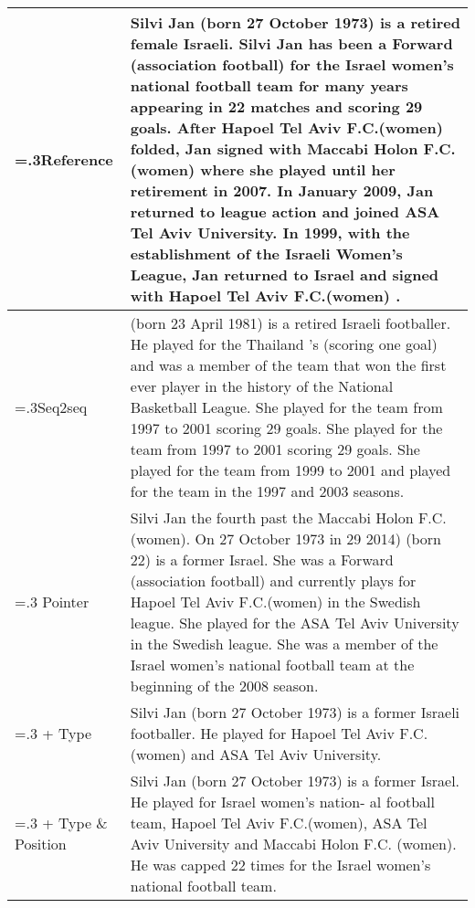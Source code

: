 \documentclass[11pt,a4paper]{article}
\begin{document}
\begin{table*}[!htb]
\small
\setlength\tabcolsep{4pt}
\setlength\extrarowheight{3pt}
\centering
\begin{tabularx}{\linewidth}{|>{\hsize=.3\hsize}X|>{\hsize=1.7\hsize}X|}
\hline
Reference & \colorbox{fl1!40}{Silvi Jan} (born \colorbox{fl2!40}{27 October 1973}) is a retired female \colorbox{fl4!40}{Israeli}. \colorbox{fl1!40}{Silvi Jan} has been a \colorbox{fl8!40}{Forward (association football)} for the \colorbox{fl5!50}{Israel women's national football team} for many years appearing in \colorbox{fl6!30}{22} matches and scoring \colorbox{fl7!40}{29} goals. After \colorbox{fl5!30}{Hapoel Tel Aviv F.C.(women)} folded, Jan signed with \colorbox{fl5!40}{Maccabi Holon F.C. (women)} where she played until her retirement in 2007. In January 2009, Jan returned to league action and joined \colorbox{fl5!20}{ASA Tel Aviv University}. In 1999, with the establishment of the Israeli Women's League, Jan returned to \colorbox{fl4!40}{Israel} and signed with \colorbox{fl5!30}{Hapoel Tel Aviv F.C.(women)} .\\ \hline
Seq2seq & (born 23 April 1981) is a retired \colorbox{fl4!40}{Israeli} footballer. He played for the Thailand 's (scoring one goal) and was a member of the team that won the first ever player in the history of the National Basketball League. She played for the team from 1997 to 2001 scoring \colorbox{fl7!40}{29} goals. She played for the team from 1997 to 2001 scoring \colorbox{fl7!40}{29} goals. She played for the team from 1999 to 2001 and played for the team in the 1997 and 2003 seasons.\\\hline
Pointer & \colorbox{fl1!40}{Silvi Jan} the fourth past the Maccabi Holon F.C. (women). On 27 October 1973 in 29 2014) (born 22) is a former \colorbox{fl4!40}{Israel}. She was a \colorbox{fl8!40}{Forward (association football)} and currently plays for \colorbox{fl5!30}{Hapoel Tel Aviv F.C.(women)} in the Swedish league. She played for the \colorbox{fl5!20}{ASA Tel Aviv University} in the Swedish league. She was a member of the \colorbox{fl5!50}{Israel women's national football team} at the beginning of the 2008 season. \\\hline
+ Type  & \colorbox{fl1!40}{Silvi Jan} (born \colorbox{fl2!40}{27 October 1973}) is a former \colorbox{fl4!40}{Israeli} footballer. He played for \colorbox{fl5!30}{Hapoel Tel Aviv} \colorbox{fl5!30}{F.C.(women)} and \colorbox{fl5!20}{ASA Tel Aviv University}. \\ \hline
+ Type \& Position & \colorbox{fl1!40}{Silvi Jan} (born \colorbox{fl2!40}{27 October 1973}) is a former \colorbox{fl4!40}{Israel}. He played for \colorbox{fl5!50}{Israel women's nation-} \colorbox{fl5!50}{al football team}, \colorbox{fl5!30}{Hapoel Tel Aviv F.C.(women)}, \colorbox{fl5!20}{ASA Tel Aviv University} and \colorbox{fl5!40}{Maccabi Holon} \colorbox{fl5!40}{F.C. (women)}. He was capped \colorbox{fl6!30}{22} times for the \colorbox{fl5!50}{Israel women's national football team}.\\ \hline

\end{tabularx}
\end{table*}
\end{document}
